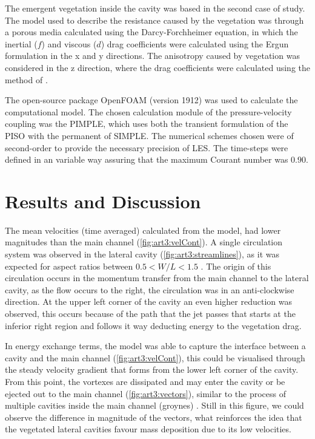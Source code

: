 The emergent vegetation inside the cavity was based in the second case of \cite{xiang2019} study. The model used to describe the resistance caused by the vegetation was through a porous media calculated using the Darcy-Forchheimer equation, in which the inertial ($f$) and viscous ($d$) drag coefficients were calculated using the Ergun formulation in the x and y directions. The anisotropy caused by vegetation was considered in the z direction, where the drag coefficients were calculated using the method of \cite{oldham2001}.

The open-source package OpenFOAM (version 1912) was used to calculate the computational model. The chosen calculation module of the pressure-velocity coupling was the PIMPLE, which uses both the transient formulation of the PISO with the permanent of SIMPLE. The numerical schemes chosen were of second-order to provide the necessary precision of LES. The time-steps were defined in an variable way assuring that the maximum Courant number was $0.90$.

\section{Results and Discussion}
The mean velocities (time averaged) calculated from the model, had lower magnitudes than the main channel (\ref{fig:art3:velCont}). A single circulation system was observed in the lateral cavity (\ref{fig:art3:streamlines}), as it was expected for aspect ratios between $0.5<W/L<1.5$ \cite{Uijttewaal2001}. The origin of this circulation occurs in the momentum transfer from the main channel to the lateral cavity, as the flow occurs to the right, the circulation was in an anti-clockwise direction. At the upper left corner of the cavity an even higher reduction was observed, this occurs because of the path that the jet passes that starts at the inferior right region and follows it way deducting energy to the vegetation drag.

In energy exchange terms, the model was able to capture the interface between a cavity and the main channel (\ref{fig:art3:velCont}), this could be visualised through the steady velocity gradient that forms from the lower left corner of the cavity. From this point, the vortexes are dissipated and may enter the cavity or be ejected out to the main channel (\ref{fig:art3:vectors}), similar to the process of multiple cavities inside the main channel (groynes) \cite{uijttewaal2005}. Still in this figure, we could observe the difference in magnitude of the vectors, what reinforces the idea that the vegetated lateral cavities favour mass deposition due to its low velocities.


